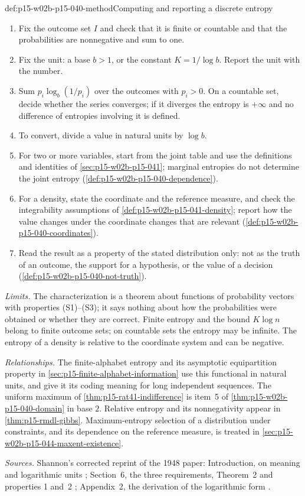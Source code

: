 \begin{hbmethod}{def:p15-w02b-p15-040-method}{Computing and reporting a discrete entropy}
\begin{enumerate}
\item Fix the outcome set \(I\) and check that it is finite or countable
and that the probabilities are nonnegative and sum to one.
\item Fix the unit: a base \(b>1\), or the constant \(K=1/\log b\).
Report the unit with the number.
\item Sum \(p_i\log_b(1/p_i)\) over the outcomes with \(p_i>0\). On a
countable set, decide whether the series converges; if it diverges the
entropy is \(+\infty\) and no difference of entropies involving it is
defined.
\item To convert, divide a value in natural units by \(\log b\).
\item For two or more variables, start from the joint table and use the
definitions and identities of \cref{sec:p15-w02b-p15-041}; marginal
entropies do not determine the joint entropy
(\cref{def:p15-w02b-p15-040-dependence}).
\item For a density, state the coordinate and the reference measure, and
check the integrability assumptions of
\cref{def:p15-w02b-p15-041-density}; report how the value changes under
the coordinate changes that are relevant
(\cref{def:p15-w02b-p15-040-coordinates}).
\item Read the result as a property of the stated distribution only: not
as the truth of an outcome, the support for a hypothesis, or the value of
a decision (\cref{def:p15-w02b-p15-040-not-truth}).
\end{enumerate}
\end{hbmethod}

\emph{Limits.} The characterization is a theorem about functions of
probability vectors with properties (S1)--(S3); it says nothing about
how the probabilities were obtained or whether they are correct.
Finite entropy and the bound \(K\log n\) belong to finite outcome sets;
on countable sets the entropy may be infinite. The entropy of a density
is relative to the coordinate system and can be negative.

\emph{Relationships.} The finite-alphabet entropy and its asymptotic
equipartition property in \cref{sec:p15-finite-alphabet-information} use
this functional in natural units, and give it its coding meaning for
long independent sequences. The uniform maximum of
\cref{thm:p15-rat41-indifference} is item~5 of
\cref{thm:p15-w02b-p15-040-domain} in base \(2\). Relative entropy and
its nonnegativity appear in \cref{thm:p15-rmdl-gibbs}. Maximum-entropy
selection of a distribution under constraints, and its dependence on the
reference measure, is treated in
\cref{sec:p15-w02b-p15-044-maxent-existence}.

\emph{Sources.} Shannon's corrected reprint of the 1948 paper:
Introduction, on meaning and logarithmic units
\cite[pp.~1--2]{Shannon1948MathematicalTheory}; Section~6, the three
requirements, Theorem~2 and properties 1 and~2
\cite[pp.~10--11]{Shannon1948MathematicalTheory}; Appendix~2, the
derivation of the logarithmic form
\cite[pp.~28--29]{Shannon1948MathematicalTheory}.
